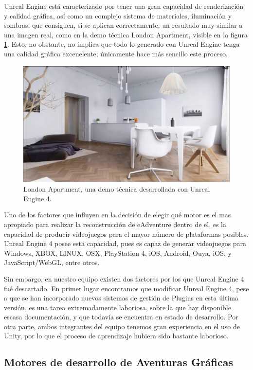 Unreal Engine está caracterizado por tener una gran capacidad de renderización y calidad gráfica, así como un complejo sistema de materiales, iluminación y sombras, que consiguen, si se aplican correctamente, un resultado muy similar a una imagen real, como en la demo técnica London Apartment, visible en la figura \ref{londonapartment}. Esto, no obstante, no implica que todo lo generado con Unreal Engine tenga una calidad gráfica excenelente; únicamente hace más sencillo este proceso.

\begin{figure}[htb]
	\includegraphics[height=2.5in]{figures/london-apartment.jpg}
	\caption[Unreal Engine 4 - London Apartment]{London Apartment, una demo técnica desarrollada con Unreal Engine 4.}
	\label{londonapartment}
\end{figure}

Uno de los factores que influyen en la decisión de elegir qué motor es el mas apropiado para realizar la reconstrucción de eAdventure dentro de el, es la capacidad de producir videojuegos para el mayor número de plataformas posibles. Unreal Engine 4 posee esta capacidad, pues es capaz de generar videojuegos para Windows, XBOX, LINUX, OSX, PlayStation 4, iOS, Android, Ouya, iOS, y JavaScript/WebGL, entre otros.

Sin embargo, en nuestro equipo existen dos factores por los que Unreal Engine 4 fué descartado. En primer lugar encontramos que modificar Unreal Engine 4, pese a que se han incorporado nuevos sistemas de gestión de Plugins en esta última versión, es una tarea extremadamente laboriosa, sobre la que hay disponible escasa documentación, y que todavía se encuentra en estado de desarrollo. Por otra parte, ambos integrantes del equipo tenemos gran experiencia en el uso de Unity, por lo que el proceso de aprendizaje hubiera sido bastante laborioso.


\subsection{Motores de desarrollo de Aventuras Gráficas}
\label{herramientasaventuras}

